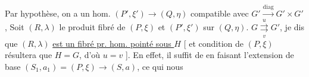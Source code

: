 Par hypothèse, on a un hom.  $(P',\xi')\longrightarrow(Q,\eta)$ compatible avec $G'\xrightarrow{\mathrm{diag}}G'\times G'$, Soit $(R,\lambda)$ le produit fibré de $(P,\xi)$ et $(P',\xi')$ sur $(Q,\eta)$.   $G\overset{u}{\underset{v}{\rightrightarrows}}G'$, je dis que $(R,\lambda)$ \uline{est un fibré pr. hom. pointé sous $H$} [ et  condition  de $(P,\xi)$ résultera  que $H=G$, d'où $u=v$ ]. En effet, il suffit de   en faisant l'extension de base $(S_1,a_1)=(P,\xi)\longrightarrow(S,a)$, ce qui nous 




